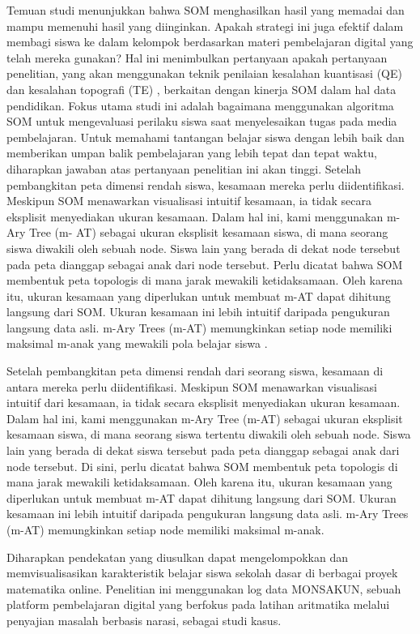     Temuan studi menunjukkan bahwa SOM menghasilkan hasil yang memadai dan mampu memenuhi hasil yang diinginkan. Apakah strategi ini juga efektif dalam membagi siswa ke dalam kelompok berdasarkan materi pembelajaran digital yang telah mereka gunakan? Hal ini menimbulkan pertanyaan apakah pertanyaan penelitian, yang akan menggunakan teknik penilaian kesalahan kuantisasi (QE) dan kesalahan topografi (TE) \citep{Breard2018}, berkaitan dengan kinerja SOM dalam hal data pendidikan. Fokus utama studi ini adalah bagaimana menggunakan algoritma SOM untuk mengevaluasi perilaku siswa saat menyelesaikan tugas pada media pembelajaran. Untuk memahami tantangan belajar siswa dengan lebih baik dan memberikan umpan balik pembelajaran yang lebih tepat dan tepat waktu, diharapkan jawaban atas pertanyaan penelitian ini akan tinggi. Setelah pembangkitan peta dimensi rendah siswa, kesamaan mereka perlu diidentifikasi. Meskipun SOM menawarkan visualisasi intuitif kesamaan, ia tidak secara eksplisit menyediakan ukuran kesamaan. Dalam hal ini, kami menggunakan m-Ary Tree (m- AT) sebagai ukuran eksplisit kesamaan siswa, di mana seorang siswa diwakili oleh sebuah node. Siswa lain yang berada di dekat node tersebut pada peta dianggap sebagai anak dari node tersebut. Perlu dicatat bahwa SOM membentuk peta topologis di mana jarak mewakili ketidaksamaan. Oleh karena itu, ukuran kesamaan yang diperlukan untuk membuat m-AT dapat dihitung langsung dari SOM. Ukuran kesamaan ini lebih intuitif daripada pengukuran langsung data asli. m-Ary Trees (m-AT) memungkinkan setiap node memiliki maksimal m-anak yang mewakili pola belajar siswa \citep{Supianto2021}.
    
    Setelah pembangkitan peta dimensi rendah dari seorang siswa, kesamaan di antara mereka perlu diidentifikasi. Meskipun SOM menawarkan visualisasi intuitif dari kesamaan, ia tidak secara eksplisit menyediakan ukuran kesamaan. Dalam hal ini, kami menggunakan m-Ary Tree (m-AT) sebagai ukuran eksplisit kesamaan siswa, di mana seorang siswa tertentu diwakili oleh sebuah node. Siswa lain yang berada di dekat siswa tersebut pada peta dianggap sebagai anak dari node tersebut. Di sini, perlu dicatat bahwa SOM membentuk peta topologis di mana jarak mewakili ketidaksamaan. Oleh karena itu, ukuran kesamaan yang diperlukan untuk membuat m-AT dapat dihitung langsung dari SOM. Ukuran kesamaan ini lebih intuitif daripada pengukuran langsung data asli. m-Ary Trees (m-AT) memungkinkan setiap node memiliki maksimal m-anak.

    Diharapkan pendekatan yang diusulkan dapat mengelompokkan dan memvisualisasikan karakteristik belajar siswa sekolah dasar di berbagai proyek matematika online. Penelitian ini menggunakan log data MONSAKUN, sebuah platform pembelajaran digital yang berfokus pada latihan aritmatika melalui penyajian masalah berbasis narasi, sebagai studi kasus.

